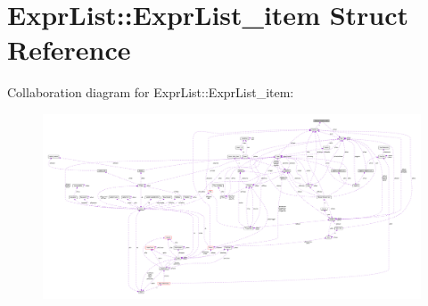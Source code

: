 \hypertarget{structExprList_1_1ExprList__item}{}\section{Expr\+List\+:\+:Expr\+List\+\_\+item Struct Reference}
\label{structExprList_1_1ExprList__item}


Collaboration diagram for Expr\+List\+:\+:Expr\+List\+\_\+item\+:\nopagebreak
\begin{figure}[H]
\begin{center}
\leavevmode
\includegraphics[width=350pt]{structExprList_1_1ExprList__item__coll__graph}
\end{center}
\end{figure}
